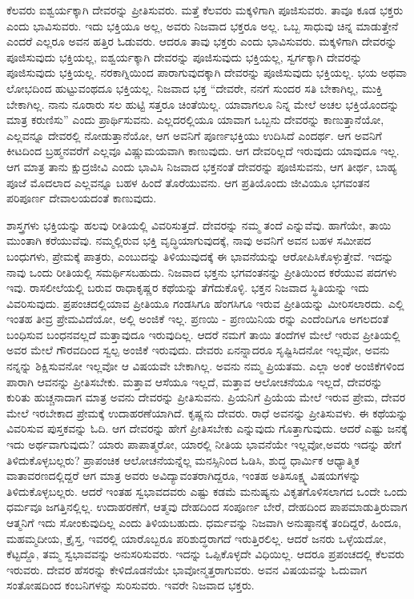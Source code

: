 ಕೆಲವರು ಐಶ್ವರ್ಯಕ್ಕಾಗಿ ದೇವರನ್ನು ಪ್ರೀತಿಸುವರು. ಮತ್ತೆ ಕೆಲವರು ಮಕ್ಕಳಿಗಾಗಿ ಪೂಜಿಸುವರು. ತಾವೂ ಕೂಡ ಭಕ್ತರು ಎಂದು ಭಾವಿಸುವರು. ಇದು ಭಕ್ತಿಯೂ ಅಲ್ಲ, ಅವರು ನಿಜವಾದ ಭಕ್ತರೂ ಅಲ್ಲ. ಒಬ್ಬ ಸಾಧುವು ಚಿನ್ನ ಮಾಡುತ್ತೇನೆ ಎಂದರೆ ಎಲ್ಲರೂ ಅವನ ಹತ್ತಿರ ಓಡುವರು. ಆದರೂ ತಾವು ಭಕ್ತರು ಎಂದು ಭಾವಿಸುವರು. ಮಕ್ಕಳಿಗಾಗಿ ದೇವರನ್ನು ಪೂಜಿಸುವುದು ಭಕ್ತಿಯಲ್ಲ, ಐಶ್ವರ್ಯಕ್ಕಾಗಿ ದೇವರನ್ನು ಪೂಜಿಸುವುದು ಭಕ್ತಿಯಲ್ಲ, ಸ್ವರ್ಗಕ್ಕಾಗಿ ದೇವರನ್ನು ಪೂಜಿಸುವುದು ಭಕ್ತಿಯಲ್ಲ. ನರಕಾಗ್ನಿಯಿಂದ ಪಾರಾಗುವುದಕ್ಕಾಗಿ ದೇವರನ್ನು ಪೂಜಿಸುವುದು ಭಕ್ತಿಯಲ್ಲ. ಭಯ ಅಥವಾ ಲೋಭದಿಂದ ಹುಟ್ಟುವಂಥದೂ ಭಕ್ತಿಯಲ್ಲ. ನಿಜವಾದ ಭಕ್ತ “ದೇವರೇ, ನನಗೆ ಸುಂದರ ಸತಿ ಬೇಕಾಗಿಲ್ಲ, ಮುಕ್ತಿ ಬೇಕಾಗಿಲ್ಲ. ನಾನು ನೂರಾರು ಸಲ ಹುಟ್ಟಿ ಸತ್ತರೂ ಚಿಂತೆಯಿಲ್ಲ. ಯಾವಾಗಲೂ ನಿನ್ನ ಮೇಲೆ ಅಚಲ ಭಕ್ತಿಯೊಂದನ್ನು ಮಾತ್ರ ಕರುಣಿಸು” ಎಂದು ಪ್ರಾರ್ಥಿಸುವನು. ಎಲ್ಲದರಲ್ಲಿಯೂ ಯಾವಾಗ ಒಬ್ಬನು ದೇವರನ್ನು ಕಾಣುತ್ತಾನೆಯೋ, ಎಲ್ಲವನ್ನೂ ದೇವರಲ್ಲಿ ನೋಡುತ್ತಾನೆಯೋ, ಆಗ ಅವನಿಗೆ ಪೂರ್ಣಭಕ್ತಿಯು ಉದಿಸಿದೆ ಎಂದರ್ಥ. ಆಗ ಅವನಿಗೆ ಕೀಟದಿಂದ ಬ್ರಹ್ಮನವರೆಗೆ ಎಲ್ಲವೂ ವಿಷ್ಣುಮಯವಾಗಿ ಕಾಣುವುದು. ಆಗ ದೇವರಿಲ್ಲದೆ ಇರುವುದು ಯಾವುದೂ ಇಲ್ಲ. ಆಗ ಮಾತ್ರ ತಾನು ಕ್ಷುದ್ರಜೀವಿ ಎಂದು ಭಾವಿಸಿ ನಿಜವಾದ ಭಕ್ತನಂತೆ ದೇವರನ್ನು ಪೂಜಿಸುವನು, ಆಗ ತೀರ್ಥ, ಬಾಹ್ಯ ಪೂಜೆ ಮೊದಲಾದ ಎಲ್ಲವನ್ನೂ ಬಹಳ ಹಿಂದೆ ತೊರೆಯುವನು. ಆಗ ಪ್ರತಿಯೊಂದು ಜೀವಿಯೂ ಭಗವಂತನ ಪರಿಪೂರ್ಣ ದೇವಾಲಯದಂತೆ ಕಾಣುವುದು.

ಶಾಸ್ತ್ರಗಳು ಭಕ್ತಿಯನ್ನು ಹಲವು ರೀತಿಯಲ್ಲಿ ವಿವರಿಸುತ್ತದೆ. ದೇವರನ್ನು ನಮ್ಮ ತಂದೆ ಎನ್ನುವೆವು. ಹಾಗೆಯೇ, ತಾಯಿ ಮುಂತಾಗಿ ಕರೆಯುವೆವು. ನಮ್ಮಲ್ಲಿರುವ ಭಕ್ತಿ ವೃದ್ಧಿಯಾಗುವುದಕ್ಕೆ, ನಾವು ಅವನಿಗೆ ಅವನ ಬಹಳ ಸಮೀಪದ ಬಂಧುಗಳು, ಪ್ರೇಮಕ್ಕೆ ಪಾತ್ರರು, ಎಂಬುದನ್ನು ತಿಳಿಯುವುದಕ್ಕೆ ಈ ಭಾವನೆಯನ್ನು ಆರೋಪಿಸಿಕೊಳ್ಳುತ್ತೇವೆ. ಇದನ್ನು ನಾವು ಒಂದು ರೀತಿಯಲ್ಲಿ ಸಮರ್ಥಿಸಬಹುದು. ನಿಜವಾದ ಭಕ್ತನು ಭಗವಂತನನ್ನು ಪ್ರೀತಿಯಿಂದ ಕರೆಯುವ ಪದಗಳು ಇವು. ರಾಸಲೀಲೆಯಲ್ಲಿ ಬರುವ ರಾಧಾಕೃಷ್ಣರ ಕಥೆಯನ್ನು ತೆಗೆದುಕೊಳ್ಳಿ. ಭಕ್ತನ ನಿಜವಾದ ಸ್ಥಿತಿಯನ್ನು ಇದು ವಿವರಿಸುವುದು. ಪ್ರಪಂಚದಲ್ಲಿ\break ಯಾವ ಪ್ರೀತಿಯೂ ಗಂಡಸಿಗೂ ಹೆಂಗಸಿಗೂ ಇರುವ ಪ್ರೀತಿಯನ್ನು ಮೀರಿಸ\-ಲಾರದು. ಎಲ್ಲಿ ಇಂತಹ ತೀವ್ರ ಪ್ರೇಮವಿದೆಯೋ, ಅಲ್ಲಿ ಅಂಜಿಕೆ ಇಲ್ಲ. ಪ್ರಣಯಿ - ಪ್ರಣಯಿನಿಯ ರನ್ನು ಎಂದೆಂದಿಗೂ ಅಗಲದಂತೆ ಬಂಧಿಸುವ ಬಂಧನವಲ್ಲದೆ ಮತ್ತಾವುದೂ ಇರುವುದಿಲ್ಲ. ಆದರೆ ನಮಗೆ ತಾಯಿ ತಂದೆಗಳ ಮೇಲೆ ಇರುವ ಪ್ರೀತಿಯಲ್ಲಿ ಅವರ ಮೇಲೆ ಗೌರವದಿಂದ ಸ್ವಲ್ಪ ಅಂಜಿಕೆ ಇರುವುದು. ದೇವರು ಏನನ್ನಾದರೂ ಸೃಷ್ಟಿಸಿದನೋ ಇಲ್ಲವೋ, ಅವನು ನನ್ನನ್ನು ಶಿಕ್ಷಿಸುವನೋ ಇಲ್ಲವೋ ಆ ವಿಷಯವೇ ಬೇಕಾಗಿಲ್ಲ. ಅವನು ನಮ್ಮ ಪ್ರಿಯತಮ. ಎಲ್ಲಾ ಅಂಕೆ ಅಂಜಿಕೆಗಳಿಂದ ಪಾರಾಗಿ ಆವನನ್ನು ಪ್ರೀತಿಸಬೇಕು. ಮತ್ತಾವ ಆಸೆಯೂ ಇಲ್ಲದೆ, ಮತ್ತಾವ ಆಲೋಚನೆಯೂ ಇಲ್ಲದೆ, ದೇವರನ್ನು ಕುರಿತು ಹುಚ್ಚನಾದಾಗ ಮಾತ್ರ ಅವನು ದೇವರನ್ನು ಪ್ರೀತಿಸುವನು. ಪ್ರಿಯನಿಗೆ ಪ್ರಿಯೆಯ ಮೇಲೆ ಇರುವ ಪ್ರೇಮ, ದೇವರ ಮೇಲೆ ಇರಬೇಕಾದ ಪ್ರೇಮಕ್ಕೆ ಉದಾಹರಣೆಯಾಗಿದೆ. ಕೃಷ್ಣನು ದೇವರು. ರಾಧೆ ಅವನನ್ನು ಪ್ರೀತಿಸುವಳು. ಈ ಕಥೆಯನ್ನು ವಿವರಿಸುವ ಪುಸ್ತಕವನ್ನು ಓದಿ. ಆಗ ದೇವರನ್ನು ಹೇಗೆ ಪ್ರೀತಿಸಬೇಕು ಎನ್ನುವುದು ಗೊತ್ತಾಗುವುದು. ಆದರೆ ಎಷ್ಟು ಜನಕ್ಕೆ ಇದು ಅರ್ಥವಾಗುವುದು? ಯಾರು ಪಾಪಾತ್ಮರೋ, ಯಾರಲ್ಲಿ ನೀತಿಯ ಭಾವನೆಯೇ ಇಲ್ಲವೋ,\break ಅವರು ಇದನ್ನು ಹೇಗೆ ತಿಳಿದುಕೊಳ್ಳಬಲ್ಲರು? ಪ್ರಾಪಂಚಿಕ ಆಲೋಚನೆ\-ಯನ್ನೆಲ್ಲ ಮನಸ್ಸಿನಿಂದ ಓಡಿಸಿ, ಶುದ್ಧ ಧಾರ್ಮಿಕ ಆಧ್ಯಾತ್ಮಿಕ ವಾತಾವರಣದಲ್ಲಿದ್ದರೆ ಆಗ ಮಾತ್ರ ಅವರು ಅವಿದ್ಯಾವಂತರಾಗಿದ್ದರೂ, ಇಂತಹ ಅತಿಸೂಕ್ಷ್ಮ ವಿಷಯ\break ಗಳನ್ನು ತಿಳಿದುಕೊಳ್ಳಬಲ್ಲರು. ಆದರೆ ಇಂತಹ ಸ್ವಭಾವದವರು ಎಷ್ಟು ಕಡಮೆ ಮನುಷ್ಯನು ವಿಕೃತಗೊಳಿಸಲಾಗದ ಒಂದೇ ಒಂದು ಧರ್ಮವೂ ಜಗತ್ತಿನಲ್ಲಿಲ್ಲ. ಉದಾಹರಣೆಗೆ, ಆತ್ಮವು ದೇಹದಿಂದ ಸಂಪೂರ್ಣ ಬೇರೆ, ದೇಹದಿಂದ ಪಾಪಮಾಡುತ್ತಿರುವಾಗ ಆತ್ಮನಿಗೆ ಇದು ಸೋಂಕುವುದಿಲ್ಲ ಎಂದು ತಿಳಿಯಬಹುದು. ಧರ್ಮವನ್ನು ನಿಜವಾಗಿ ಅನುಷ್ಠಾನಕ್ಕೆ ತಂದಿದ್ದರೆ, ಹಿಂದೂ, ಮಹಮ್ಮದೀಯ, ಕ್ರೈಸ್ತ, ಇವರಲ್ಲಿ ಯಾರೊಬ್ಬರೂ ಪರಿಶುದ್ಧರಾಗದೆ ಇರುತ್ತಿರಲಿಲ್ಲ. ಆದರೆ ಜನರು ಒಳ್ಳೆಯದೋ, ಕೆಟ್ಟದ್ದೊ, ತಮ್ಮ ಸ್ವಭಾವವನ್ನು ಅನುಸರಿಸುವರು. ಇದನ್ನು ಒಪ್ಪಿಕೊಳ್ಳದೇ ವಿಧಿಯಿಲ್ಲ. ಆದರೂ ಪ್ರಪಂಚದಲ್ಲಿ ಕೆಲವರು ಇರುವರು. ದೇವರ ಹೆಸರನ್ನು ಕೇಳಿದೊಡನೆಯೇ ಭಾವೋನ್ಮತ್ತರಾಗುವರು. ಅವನ ವಿಷಯವನ್ನು ಓದುವಾಗ ಸಂತೋಷದಿಂದ ಕಂಬನಿಗಳನ್ನು ಸುರಿಸುವರು. ಇವರೇ ನಿಜವಾದ ಭಕ್ತರು.

